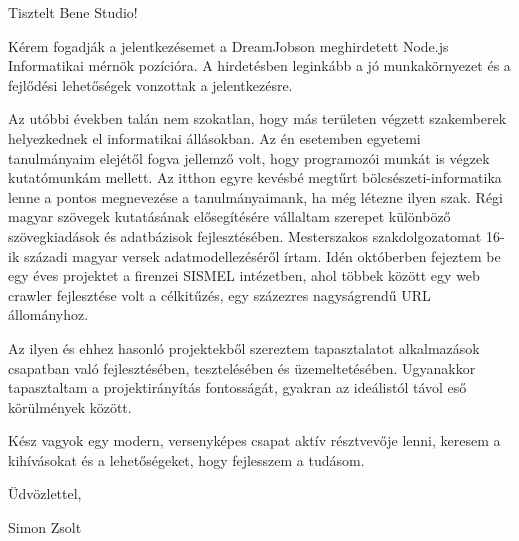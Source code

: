 

\setmainfont[Mapping=tex-text,Numbers=OldStyle,Ligatures=TeX]{Linux Biolinum O}

\setlength{\parindent}{1.5em}
\renewcommand{\baselinestretch}{1.1}
\def \addressee {Bene Studio}


	

	\thispagestyle{empty}
		
	Tisztelt \addressee!

	\vspace{1em}

	Kérem fogadják a jelentkezésemet a DreamJobson meghirdetett Node.js Informatikai mérnök pozícióra. 
	A hirdetésben leginkább a jó munkakörnye\-zet és a fejlődési lehetőségek vonzottak a jelentkezésre.

	Az utóbbi években talán nem szokatlan, hogy más területen végzett szakemberek helyezkednek el informatikai állásokban.
	Az én esetemben egyetemi tanulmányaim elejétől fogva jellemző volt, hogy programozói munkát is végzek kutatómunkám mellett.
	Az itthon egyre kevésbé megtűrt bölcsészeti-informatika lenne a pontos megnevezése a tanulmányaimank, ha még létezne ilyen szak.
	Régi magyar szövegek kutatásának elősegítésére vállaltam szerepet különböző szövegkiadások és adatbázisok fejlesztésében. 
	Mesterszakos szakdolgozatomat 16-ik századi magyar versek adatmodellezéséről írtam.
	Idén októberben fejeztem be egy éves projektet a firenzei SISMEL intézetben, ahol többek között egy web crawler fejlesztése volt a célkitűzés, egy százezres nagyságrendű URL állományhoz.

	Az ilyen és ehhez hasonló projektekből szereztem tapasztalatot alkalmazások csapatban való fejlesztésében, tesztelésében és üzemeltetésében.
	Ugyanakkor tapasztaltam a projektirányítás fontosságát, gyakran az ide\-álistól távol eső körülmények között.

	Kész vagyok egy modern, versenyképes csapat aktív résztvevője lenni, keresem a kihívásokat és a lehetőségeket, hogy fejlesszem a tudásom.

	\begin{flushleft}
		Üdvözlettel,

		Simon Zsolt
	\end{flushleft}

